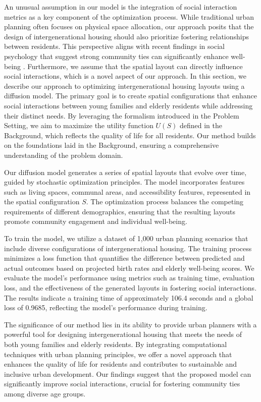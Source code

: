 \documentclass{article} %
\begin{document}
An unusual assumption in our model is the integration of social interaction metrics as a key component of the optimization process. While traditional urban planning often focuses on physical space allocation, our approach posits that the design of intergenerational housing should also prioritize fostering relationships between residents. This perspective aligns with recent findings in social psychology that suggest strong community ties can significantly enhance well-being \citep{power2022grokking}. Furthermore, we assume that the spatial layout can directly influence social interactions, which is a novel aspect of our approach.
In this section, we describe our approach to optimizing intergenerational housing layouts using a diffusion model. The primary goal is to create spatial configurations that enhance social interactions between young families and elderly residents while addressing their distinct needs. By leveraging the formalism introduced in the Problem Setting, we aim to maximize the utility function \( U(S) \) defined in the Background, which reflects the quality of life for all residents. Our method builds on the foundations laid in the Background, ensuring a comprehensive understanding of the problem domain.

Our diffusion model generates a series of spatial layouts that evolve over time, guided by stochastic optimization principles. The model incorporates features such as living spaces, communal areas, and accessibility features, represented in the spatial configuration \( S \). The optimization process balances the competing requirements of different demographics, ensuring that the resulting layouts promote community engagement and individual well-being.

To train the model, we utilize a dataset of 1,000 urban planning scenarios that include diverse configurations of intergenerational housing. The training process minimizes a loss function that quantifies the difference between predicted and actual outcomes based on projected birth rates and elderly well-being scores. We evaluate the model's performance using metrics such as training time, evaluation loss, and the effectiveness of the generated layouts in fostering social interactions. The results indicate a training time of approximately 106.4 seconds and a global loss of 0.9685, reflecting the model's performance during training.

The significance of our method lies in its ability to provide urban planners with a powerful tool for designing intergenerational housing that meets the needs of both young families and elderly residents. By integrating computational techniques with urban planning principles, we offer a novel approach that enhances the quality of life for residents and contributes to sustainable and inclusive urban development. Our findings suggest that the proposed model can significantly improve social interactions, crucial for fostering community ties among diverse age groups.
\end{document}
